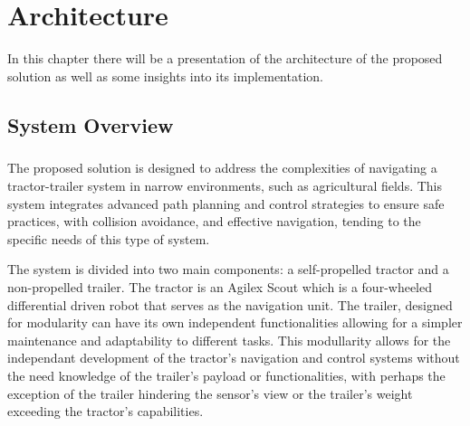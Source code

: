 
%

\chapter{Architecture}
\label{cha:architecture}

In this chapter there will be a presentation of the architecture of the proposed solution as well as some insights into its 
implementation.

\section{System Overview}
\label{sec:systemoverview}
\paragraph{}The proposed solution is designed to address the complexities of navigating a 
tractor-trailer system in narrow environments, such as agricultural fields. This system integrates 
advanced path planning and control strategies to ensure safe practices, with collision avoidance, and 
effective navigation, tending to the specific needs of this type of system.

The system is divided into two main components: a self-propelled tractor and a non-propelled trailer. 
The tractor is an Agilex Scout which is a four-wheeled differential driven robot that serves as the 
navigation unit. The trailer, designed for modularity can have its own independent functionalities 
allowing for a simpler maintenance and adaptability to different tasks. This modullarity allows 
for the independant development of the tractor's navigation and control systems without the need knowledge of the trailer's 
payload or functionalities, with perhaps the exception of the trailer hindering the sensor's view 
or the trailer's weight exceeding the tractor's capabilities.

